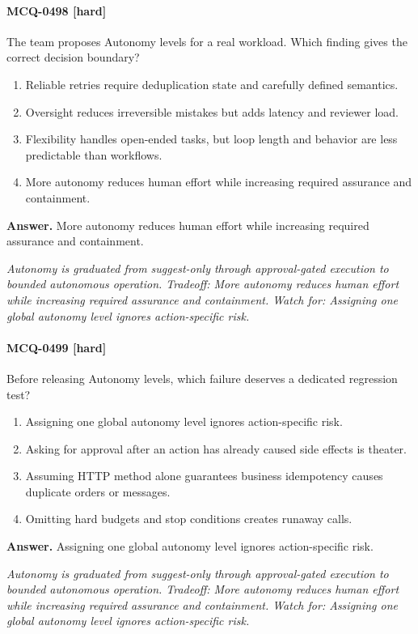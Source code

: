 \paragraph{MCQ-0498 [hard]} The team proposes Autonomy levels for a real workload. Which finding gives the correct decision boundary?
\begin{enumerate}[label=\Alph*.]
\item Reliable retries require deduplication state and carefully defined semantics.
\item Oversight reduces irreversible mistakes but adds latency and reviewer load.
\item Flexibility handles open-ended tasks, but loop length and behavior are less predictable than workflows.
\item More autonomy reduces human effort while increasing required assurance and containment.
\end{enumerate}
\noindent\textbf{Answer.} More autonomy reduces human effort while increasing required assurance and containment.
\par\textit{Autonomy is graduated from suggest-only through approval-gated execution to bounded autonomous operation. Tradeoff: More autonomy reduces human effort while increasing required assurance and containment. Watch for: Assigning one global autonomy level ignores action-specific risk.}
\paragraph{MCQ-0499 [hard]} Before releasing Autonomy levels, which failure deserves a dedicated regression test?
\begin{enumerate}[label=\Alph*.]
\item Assigning one global autonomy level ignores action-specific risk.
\item Asking for approval after an action has already caused side effects is theater.
\item Assuming HTTP method alone guarantees business idempotency causes duplicate orders or messages.
\item Omitting hard budgets and stop conditions creates runaway calls.
\end{enumerate}
\noindent\textbf{Answer.} Assigning one global autonomy level ignores action-specific risk.
\par\textit{Autonomy is graduated from suggest-only through approval-gated execution to bounded autonomous operation. Tradeoff: More autonomy reduces human effort while increasing required assurance and containment. Watch for: Assigning one global autonomy level ignores action-specific risk.}
